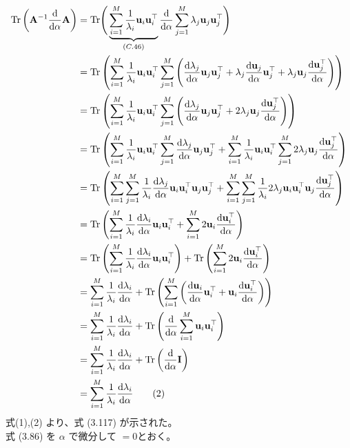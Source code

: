 \documentclass{jsarticle}
\begin{document}
\begin{align*}
    {\rm Tr}\left({\bf A}^{-1}\frac{\rm d}{{\rm d}\alpha}{\bf A}\right)
    &={\rm Tr}\Bigg(\underbrace{\sum_{i=1}^M\frac{1}{\lambda_i}{\bf u}_i{\bf u}_i^\top}_{(C.46)}\frac{\rm d}{{\rm d}\alpha}\sum_{j=1}^M\lambda_j{\bf u}_j{\bf u}_j^\top\Bigg)\\
    &={\rm Tr}\left(\sum_{i=1}^M\frac{1}{\lambda_i}{\bf u}_i{\bf u}_i^\top\sum_{j=1}^M\left(\frac{{\rm d}\lambda_j}{{\rm d}\alpha}{\bf u}_j{\bf u}_j^\top+\lambda_j\frac{{\rm d}{\bf u}_j}{{\rm d}\alpha}{\bf u}_j^\top+\lambda_j{\bf u}_j\frac{{\rm d}{\bf u}_j^\top}{{\rm d}\alpha}\right)\right)\\
    &={\rm Tr}\left(\sum_{i=1}^M\frac{1}{\lambda_i}{\bf u}_i{\bf u}_i^\top\sum_{j=1}^M\left(\frac{{\rm d}\lambda_j}{{\rm d}\alpha}{\bf u}_j{\bf u}_j^\top+2\lambda_j{\bf u}_j\frac{{\rm d}{\bf u}_j^\top}{{\rm d}\alpha}\right)\right)\\
    &={\rm Tr}\left(\sum_{i=1}^M\frac{1}{\lambda_i}{\bf u}_i{\bf u}_i^\top\sum_{j=1}^M\frac{{\rm d}\lambda_j}{{\rm d}\alpha}{\bf u}_j{\bf u}_j^\top+\sum_{i=1}^M\frac{1}{\lambda_i}{\bf u}_i{\bf u}_i^\top\sum_{j=1}^M2\lambda_j{\bf u}_j\frac{{\rm d}{\bf u}_j^\top}{{\rm d}\alpha}\right)\\
    &={\rm Tr}\left(\sum_{i=1}^M\sum_{j=1}^M\frac{1}{\lambda_i}\frac{{\rm d}\lambda_j}{{\rm d}\alpha}{\bf u}_i{\bf u}_i^\top{\bf u}_j{\bf u}_j^\top+\sum_{i=1}^M\sum_{j=1}^M\frac{1}{\lambda_i}2\lambda_j{\bf u}_i{\bf u}_i^\top{\bf u}_j\frac{{\rm d}{\bf u}_j^\top}{{\rm d}\alpha}\right)\\
    &={\rm Tr}\left(\sum_{i=1}^M\frac{1}{\lambda_i}\frac{{\rm d}\lambda_i}{{\rm d}\alpha}{\bf u}_i{\bf u}_i^\top+\sum_{i=1}^M2{\bf u}_i\frac{{\rm d}{\bf u}_i^\top}{{\rm d}\alpha}\right)\\
    &={\rm Tr}\left(\sum_{i=1}^M\frac{1}{\lambda_i}\frac{{\rm d}\lambda_i}{{\rm d}\alpha}{\bf u}_i{\bf u}_i^\top\right)+{\rm Tr}\left(\sum_{i=1}^M2{\bf u}_i\frac{{\rm d}{\bf u}_i^\top}{{\rm d}\alpha}\right)\\
    &=\sum_{i=1}^M\frac{1}{\lambda_i}\frac{{\rm d}\lambda_i}{{\rm d}\alpha}+{\rm Tr}\left(\sum_{i=1}^M\left(\frac{{\rm d}{\bf u}_i}{{\rm d}\alpha}{\bf u}_i^\top+{\bf u}_i\frac{{\rm d}{\bf u}_i^\top}{{\rm d}\alpha}\right)\right)\\
    &=\sum_{i=1}^M\frac{1}{\lambda_i}\frac{{\rm d}\lambda_i}{{\rm d}\alpha}+{\rm Tr}\left(\frac{{\rm d}}{{\rm d}\alpha}\sum_{i=1}^M{\bf u}_i{\bf u}_i^\top\right)\\
    &=\sum_{i=1}^M\frac{1}{\lambda_i}\frac{{\rm d}\lambda_i}{{\rm d}\alpha}+{\rm Tr}\left(\frac{{\rm d}}{{\rm d}\alpha}{\bf I}\right)\\
    &=\sum_{i=1}^M\frac{1}{\lambda_i}\frac{{\rm d}\lambda_i}{{\rm d}\alpha}\tag{2}
\end{align*}
式(1),(2) より、式 (3.117) が示された。 \\
式 (3.86) を $\alpha$ で微分して $=0$とおく。
\end{document}
